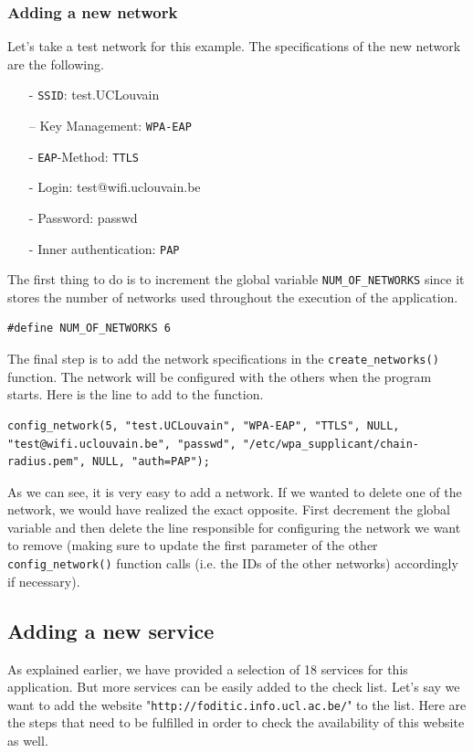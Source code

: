 \subsubsection*{Adding a new network}
Let's take a test network for this example. The specifications of the new network are the following.

\begin{itemize}
	\item [-] \texttt{SSID}: test.UCLouvain
	\item [–] Key Management: \texttt{WPA-EAP}
	\item [-] \texttt{EAP}-Method: \texttt{TTLS}
	\item [-] Login: test@wifi.uclouvain.be
	\item [-] Password: passwd
	\item [-] Inner authentication: \texttt{PAP}
\end{itemize}

The first thing to do is to increment the global variable \texttt{NUM\_OF\_NETWORKS} since it stores the number of networks used throughout the execution of the application.\\

\begin{lstlisting}[frame=single,breaklines=true]
#define NUM_OF_NETWORKS 6
\end{lstlisting}

The final step is to add the network specifications in the \texttt{create\_networks()} function. The network will be configured with the others when the program starts. Here is the line to add to the function.\\

\begin{lstlisting}[frame=single,breaklines=true]
config_network(5, "test.UCLouvain", "WPA-EAP", "TTLS", NULL, "test@wifi.uclouvain.be", "passwd", "/etc/wpa_supplicant/chain-radius.pem", NULL, "auth=PAP");
\end{lstlisting}

As we can see, it is very easy to add a network. If we wanted to delete one of the network, we would have realized the exact opposite. First decrement the global variable and then delete the line responsible for configuring the network we want to remove (making sure to update the first parameter of the other \texttt{config\_network()} function calls (i.e. the IDs of the other networks) accordingly if necessary).


\subsection*{Adding a new service}
As explained earlier, we have provided a selection of 18 services for this application. But more services can be easily added to the check list. Let's say we want to add the website "\texttt{http://foditic.info.ucl.ac.be/}" to the list. Here are the steps that need to be fulfilled in order to check the availability of this website as well.

